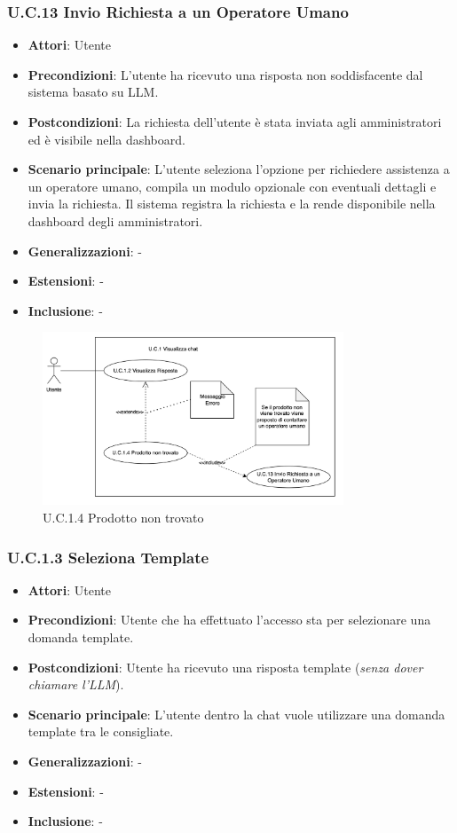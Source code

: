 \subsubsection{U.C.13 Invio Richiesta a un Operatore Umano}
\begin{itemize}
    \item \textbf{Attori}: Utente
    \item \textbf{Precondizioni}: L’utente ha ricevuto una risposta non soddisfacente dal sistema basato su LLM.
    \item \textbf{Postcondizioni}: La richiesta dell’utente è stata inviata agli amministratori ed è visibile nella dashboard.
    \item \textbf{Scenario principale}: L’utente seleziona l’opzione per richiedere assistenza a un operatore umano, compila un modulo opzionale con eventuali dettagli e invia la richiesta. Il sistema registra la richiesta e la rende disponibile nella dashboard degli amministratori.
    \item \textbf{Generalizzazioni}: -
    \item \textbf{Estensioni}: -
    \item \textbf{Inclusione}: -
\end{itemize}
\begin{figure}[h!]
    \centering
    \includegraphics[width=0.8\textwidth]{img/UC1-4.png}
    \caption{U.C.1.4 Prodotto non trovato}
\end{figure}
\subsubsection{U.C.1.3 Seleziona Template}
\begin{itemize}
    \item \textbf{Attori}: Utente
    \item \textbf{Precondizioni}: Utente che ha effettuato l’accesso sta per selezionare una domanda template.
    \item \textbf{Postcondizioni}: Utente ha ricevuto una risposta template (\textit{senza dover chiamare l’LLM}).
    \item \textbf{Scenario principale}: L’utente dentro la chat vuole utilizzare una domanda template tra le consigliate.
    \item \textbf{Generalizzazioni}: -
    \item \textbf{Estensioni}: -
    \item \textbf{Inclusione}: -
\end{itemize}

